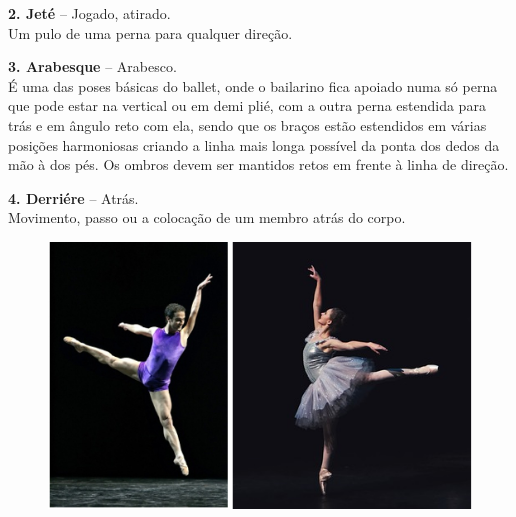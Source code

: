 \begin{mdframed}[linewidth=2pt,linecolor=salmao,backgroundcolor=salmao!20]
\textbf{2. Jeté} – Jogado, atirado.\\
Um pulo de uma perna para qualquer direção.
\end{mdframed}

\begin{mdframed}[linewidth=2pt,linecolor=salmao,backgroundcolor=salmao!20]
\textbf{3. Arabesque} – Arabesco.\\
É uma das poses básicas do ballet, onde o bailarino fica apoiado numa só
perna que pode estar na vertical ou em demi plié, com a outra perna
estendida para trás e em ângulo reto com ela, sendo que os braços estão
estendidos em várias posições harmoniosas criando a linha mais longa
possível da ponta dos dedos da mão à dos pés. Os ombros devem ser
mantidos retos em frente à linha de direção.
\end{mdframed}

\begin{mdframed}[linewidth=2pt,linecolor=salmao,backgroundcolor=salmao!20]
\textbf{4. Derriére} – Atrás.\\
Movimento, passo ou a colocação de um membro atrás do corpo.
\end{mdframed}

\begin{figure}[htpb!]
\includegraphics[width=\textwidth]{./imgs/art15ab.png}
\end{figure}

